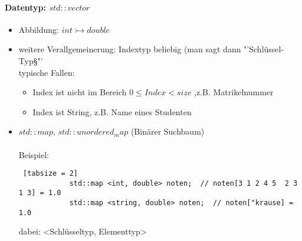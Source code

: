 \documentclass{article}
\begin{document}
	 	\paragraph{Datentyp: $std::vector$}
	 	
	 	\begin{itemize}
	 	\begin{lstlisting} [tabsize = 2]
	 		#include <vector>
	 		
	 		std::vector <double> v(20, 0.0) ;  // initialisiert mit Groesse, Initialwert
	 		
	 		// analog: std::vector<int>, std::vector<std::string>
	 	\end{lstlisting}
	 	\item Abbildung: $int \rightarrowtail double$
	 	
	 	\item weitere Verallgemeinerung: Indextyp beliebig (man sagt dann "'Schlüssel-Typ§"' \\
	 	typische Fallen:
	 	\begin{itemize}
	 		\item Index ist nicht im Bereich $0 \leq Index < size$ ,z.B. Matrikelnummer
	 		\item Index ist String, z.B. Name eines Studenten
	 	\end{itemize}
	 	\item $std::map, \, std::unordered_map$ (Binärer Suchbaum) \\ \\
	 	 Beispiel:
	 	 \begin{lstlisting} [tabsize = 2]
	 	 	std::map <int, double> noten;  // noten[3 1 2 4 5  2 3 1 3] = 1.0
	 	 	std::map <string, double> noten;  // noten["krause] = 1.0
	 	 \end{lstlisting}
	 	 dabei: <Schlüsseltyp, Elementtyp>
	 \end{itemize}
	 
\end{document}
